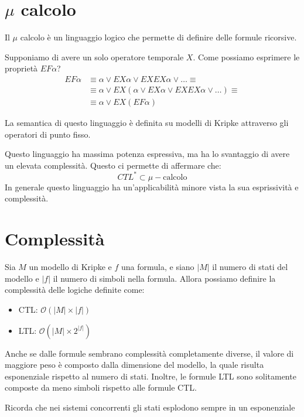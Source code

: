 \section{$\mu$ calcolo}
Il $\mu$ calcolo è un linguaggio logico che permette di definire delle formule
ricorsive.
\begin{esempio}
    Supponiamo di avere un solo operatore temporale $X$. Come possiamo esprimere
    le proprietà $EF \alpha$?
    \begin{equation}
        \begin{array}{ll}            
            EF\alpha &\equiv \alpha\lor EX\alpha\lor EXEX\alpha\lor \dots \equiv\\
            &\equiv \alpha\lor EX(\alpha\lor EX\alpha\lor EXEX\alpha\lor \dots)\equiv\\
            &\equiv \alpha \lor EX(EF\alpha)
        \end{array}
    \end{equation}
\end{esempio}
La semantica di questo linguaggio è definita su modelli di Kripke attraverso
gli operatori di punto fisso.

Questo linguaggio ha massima potenza espressiva, ma ha lo svantaggio di avere
un elevata complessità. Questo ci permette di affermare che:
\begin{equation}
    CTL^{\ast} \subset \mu-\text{calcolo}
\end{equation}
In generale questo linguaggio ha un'applicabilità minore vista la sua esprissività
e complessità.

\section{Complessità}
Sia $M$ un modello di Kripke e $f$ una formula, e siano $|M|$ il numero di stati
del modello e $|f|$ il numero di simboli nella formula. Allora possiamo definire
la complessità delle logiche definite come:
\begin{itemize}
    \item CTL: $\mathcal{O}(|M| \times |f|)$
    \item LTL: $\mathcal{O}(|M| \times 2^{|f|})$
\end{itemize}
Anche se dalle formule sembrano complessità completamente diverse, il valore di
maggiore peso è composto dalla dimensione del modello, la quale risulta
esponenziale rispetto al numero di stati. Inoltre, le formule LTL sono solitamente
composte da meno simboli rispetto alle formule CTL.
\begin{nota}
    Ricorda che nei sistemi concorrenti gli stati esplodono sempre in un esponenziale
\end{nota}

